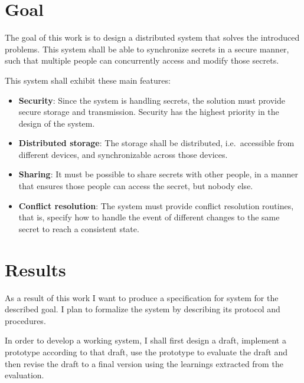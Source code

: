 \section{Goal}

The goal of this work is to design a  distributed system that solves the
introduced problems. This system shall be able to synchronize secrets in a
secure manner, such that multiple people can concurrently access and modify
those secrets.

This system shall exhibit these main features:

\begin{itemize}
    \item \textbf{Security}: Since the system is handling secrets, the solution
        must provide secure storage and transmission. Security has the highest
        priority in the design of the system.

    \item \textbf{Distributed storage}: The storage shall be distributed, i.e.\ 
        accessible from different devices, and synchronizable across those
        devices. 

    \item \textbf{Sharing}: It must be possible to share secrets with other
        people, in a manner that ensures those people can access the secret,
        but nobody else.
        
    \item \textbf{Conflict resolution}: The system must provide conflict
        resolution routines, that is, specify how to handle the event of
        different changes to the same secret to reach a consistent state.

\end{itemize}

\section{Results}

As a result of this work I want to produce a specification for system for the
described goal. I plan to formalize the system by describing its protocol and
procedures.

In order to develop a working system, I shall first design a draft, implement a
prototype according to that draft, use the prototype to evaluate the draft and
then revise the draft to a final version using the learnings extracted from the
evaluation.

